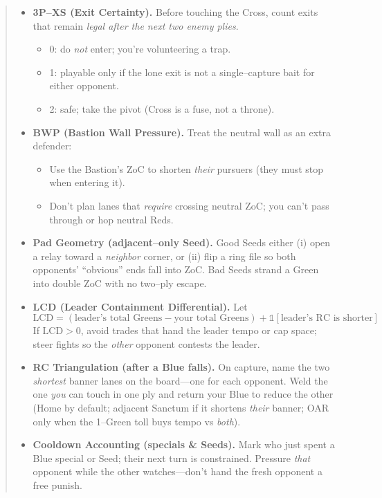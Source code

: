 \documentclass[11pt]{article}
\begin{document}
\begin{quote}
\begin{itemize}[leftmargin=1.3em,itemsep=0.35em]
  \item \textbf{3P–XS (Exit Certainty).} Before touching the Cross, count exits that remain \emph{legal after the next two enemy plies}.
  \begin{itemize}[itemsep=0.2em]
    \item 0: do \emph{not} enter; you’re volunteering a trap.
    \item 1: playable only if the lone exit is not a single–capture bait for either opponent.
    \item 2: safe; take the pivot (Cross is a fuse, not a throne).
  \end{itemize}

  \item \textbf{BWP (Bastion Wall Pressure).} Treat the neutral wall as an extra defender:
  \begin{itemize}[itemsep=0.2em]
    \item Use the Bastion’s ZoC to shorten \emph{their} pursuers (they must stop when entering it).
    \item Don’t plan lanes that \emph{require} crossing neutral ZoC; you can’t pass through or hop neutral Reds.
  \end{itemize}

  \item \textbf{Pad Geometry (adjacent–only Seed).} Good Seeds either (i) open a relay toward a \emph{neighbor} corner, or (ii) flip a ring file so both opponents’ “obvious” ends fall into ZoC. Bad Seeds strand a Green into double ZoC with no two–ply escape.

  \item \textbf{LCD (Leader Containment Differential).} Let
  \[
    \mathrm{LCD} = (\text{leader’s total Greens} - \text{your total Greens}) + \mathbb{1}[\text{leader’s RC is shorter}]
  \]
  If $\mathrm{LCD}>0$, avoid trades that hand the leader tempo or cap space; steer fights so the \emph{other} opponent contests the leader.

  \item \textbf{RC Triangulation (after a Blue falls).} On capture, name the two \emph{shortest} banner lanes on the board—one for each opponent. Weld the one \emph{you} can touch in one ply and return your Blue to reduce the other (Home by default; adjacent Sanctum if it shortens \emph{their} banner; OAR only when the 1–Green toll buys tempo vs \emph{both}).

  \item \textbf{Cooldown Accounting (specials \& Seeds).} Mark who just spent a Blue special or Seed; their next turn is constrained. Pressure \emph{that} opponent while the other watches—don’t hand the fresh opponent a free punish.


\end{itemize}
\end{quote}
\end{document}
